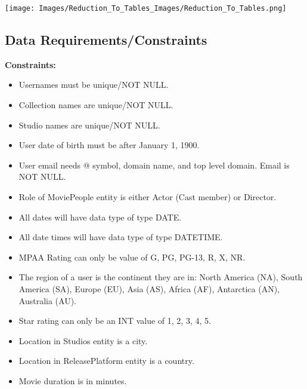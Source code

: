 \documentclass[12pt]{article}
\begin{document}
{
    \captionsetup[figure]{labelformat=empty}
    \centering
    \texttt{[image: Images/Reduction\_To\_Tables\_Images/Reduction\_To\_Tables.png]}
}

\subsection{Data Requirements/Constraints}
\textbf{Constraints:}
\begin{itemize}
    \item Usernames must be unique/NOT NULL. 
    \item Collection names are unique/NOT NULL.
    \item Studio names are unique/NOT NULL.
    \item User date of birth must be after January 1, 1900. 
    \item User email needs @ symbol, domain name, and top level domain. Email is NOT NULL.
    \item Role of MoviePeople entity is either Actor (Cast member) or Director.
    \item All dates will have data type of type DATE.
    \item All date times will have data type of type DATETIME.
    \item MPAA Rating can only be value of G, PG, PG-13, R, X, NR.
    \item The region of a user is the continent they are in: North America (NA), South America (SA), Europe (EU), Asia (AS), Africa (AF), Antarctica (AN), Australia (AU).
    \item Star rating can only be an INT value of 1, 2, 3, 4, 5.
    \item Location in Studios entity is a city.
    \item Location in ReleasePlatform entity is a country.
    \item Movie duration is in minutes.
\end{itemize}
\end{document}
